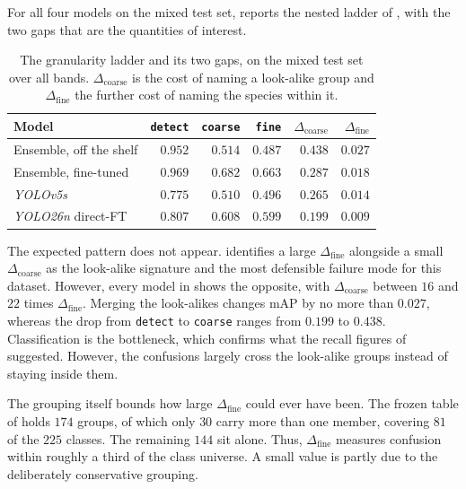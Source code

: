 For all four models on the mixed test set,  reports the nested ladder of , with the two gaps that are the quantities of interest.

\begin{table}[htbp]
\centering
\caption[Granularity gap decomposition on the mixed test set]{The granularity ladder and its two gaps, on the mixed test set over all bands. $\Delta_{\text{coarse}}$ is the cost of naming a look-alike group and $\Delta_{\text{fine}}$ the further cost of naming the species within it.}
\label{tab:granularity-gaps}
\begin{tabular}{@{}lrrrrr@{}}
\toprule
Model & \texttt{detect} & \texttt{coarse} & \texttt{fine} & $\Delta_{\text{coarse}}$ & $\Delta_{\text{fine}}$ \\
\midrule
Ensemble, off the shelf & $0.952$ & $0.514$ & $0.487$ & $0.438$ & $0.027$ \\
Ensemble, fine-tuned & $0.969$ & $0.682$ & $0.663$ & $0.287$ & $0.018$ \\
\textit{YOLOv5s} & $0.775$ & $0.510$ & $0.496$ & $0.265$ & $0.014$ \\
\textit{YOLO26n} direct-FT & $0.807$ & $0.608$ & $0.599$ & $0.199$ & $0.009$ \\
\bottomrule
\end{tabular}
\end{table}

The expected pattern does not appear.  identifies a large $\Delta_{\text{fine}}$ alongside a small $\Delta_{\text{coarse}}$ as the look-alike signature and the most defensible failure mode for this dataset. However, every model in  shows the opposite, with $\Delta_{\text{coarse}}$ between $16$ and $22$ times $\Delta_{\text{fine}}$. Merging the look-alikes changes mAP by no more than $0.027$, whereas the drop from \texttt{detect} to \texttt{coarse} ranges from $0.199$ to $0.438$. Classification is the bottleneck, which confirms what the recall figures of  suggested. However, the confusions largely cross the look-alike groups instead of staying inside them.

The grouping itself bounds how large $\Delta_{\text{fine}}$ could ever have been. The frozen table of  holds $174$ groups, of which only $30$ carry more than one member, covering $81$ of the $225$ classes.  %
The remaining $144$ sit alone. Thus, $\Delta_{\text{fine}}$ measures confusion within roughly a third of the class universe. A small value is partly due to the deliberately conservative grouping.

